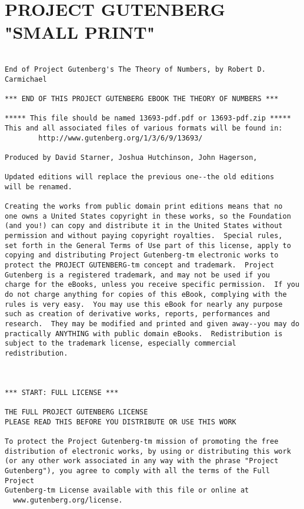 \documentclass[oneside]{book}
\begin{document}
\chapter{PROJECT GUTENBERG "SMALL PRINT"}
\small
{}
\begin{verbatim}

End of Project Gutenberg's The Theory of Numbers, by Robert D. Carmichael

*** END OF THIS PROJECT GUTENBERG EBOOK THE THEORY OF NUMBERS ***

***** This file should be named 13693-pdf.pdf or 13693-pdf.zip *****
This and all associated files of various formats will be found in:
        http://www.gutenberg.org/1/3/6/9/13693/

Produced by David Starner, Joshua Hutchinson, John Hagerson,

Updated editions will replace the previous one--the old editions
will be renamed.

Creating the works from public domain print editions means that no
one owns a United States copyright in these works, so the Foundation
(and you!) can copy and distribute it in the United States without
permission and without paying copyright royalties.  Special rules,
set forth in the General Terms of Use part of this license, apply to
copying and distributing Project Gutenberg-tm electronic works to
protect the PROJECT GUTENBERG-tm concept and trademark.  Project
Gutenberg is a registered trademark, and may not be used if you
charge for the eBooks, unless you receive specific permission.  If you
do not charge anything for copies of this eBook, complying with the
rules is very easy.  You may use this eBook for nearly any purpose
such as creation of derivative works, reports, performances and
research.  They may be modified and printed and given away--you may do
practically ANYTHING with public domain eBooks.  Redistribution is
subject to the trademark license, especially commercial
redistribution.



*** START: FULL LICENSE ***

THE FULL PROJECT GUTENBERG LICENSE
PLEASE READ THIS BEFORE YOU DISTRIBUTE OR USE THIS WORK

To protect the Project Gutenberg-tm mission of promoting the free
distribution of electronic works, by using or distributing this work
(or any other work associated in any way with the phrase "Project
Gutenberg"), you agree to comply with all the terms of the Full Project
Gutenberg-tm License available with this file or online at
  www.gutenberg.org/license.



\end{verbatim}
\end{document}
